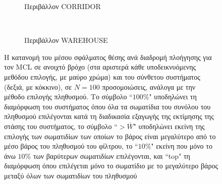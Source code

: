 \begin{figure}
  \vspace{2cm}
  \begin{subfigure}{\linewidth}
  \hspace{-1.25cm}
    
    \vspace{0.3cm}
    \caption{Περιβάλλον CORRIDOR}
    \label{}
  \end{subfigure}\\
  \begin{subfigure}{\linewidth}\vspace{0.5cm}
    \hspace{-1.25cm}
    
    \vspace{0.3cm}
    \caption{Περιβάλλον WAREHOUSE}
    \label{}
    \end{subfigure}
\caption{\small Η κατανομή του μέσου σφάλματος θέσης ανά διαδρομή πλοήγησης
         για τον MCL σε ανοιχτό βρόχο (στα αριστερά κάθε υποδεικνυόμενης
         μεθόδου επιλογής, με μαύρο χρώμα) και του σύνθετου συστήματος (δεξιά,
         με κόκκινο), σε $N=100$ προσομοιώσεις, ανάλογα με την μέθοδο επιλογής
         πληθυσμού. Το σύμβολο ``$100\%$" υποδηλώνει τη διαμόρφωση του
         συστήματος όπου όλα τα σωματίδια του συνόλου του πληθυσμού επιλέγονται
         κατά τη διαδικασία εξαγωγής της εκτίμησης της στάσης του συστήματος,
         το σύμβολο ``$>\overline{W}$" υποδηλώνει εκείνη της επιλογής των
         σωματιδίων των οποίων το βάρος είναι μεγαλύτερο από το μέσο βάρος του
         πληθυσμού του φίλτρου, το ``$10\%$" εκείνη που μόνο το άνω $10\%$ των
         βαρύτερων σωματιδίων επιλέγονται, και ``top" τη διαμόρφωση όπου
         επιλέγεται μόνο το σωματίδιο με το μεγαλύτερο βάρος μεταξύ όλων των
         σωματιδίων του πληθυσμού}
\label{fig:02_02_04:selections_position_zoomed}
\end{figure}
